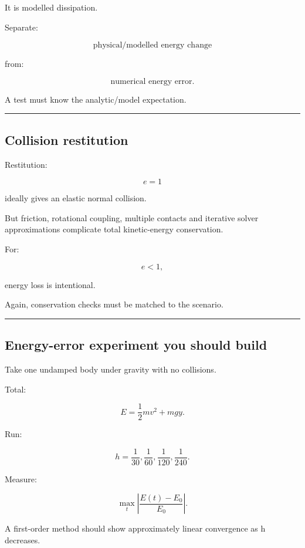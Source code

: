 It is modelled dissipation.

Separate:

\[
\boxed{
\text{physical/modelled energy change}
}
\]

from:

\[
\boxed{
\text{numerical energy error}.
}
\]

A test must know the analytic/model expectation.

\begin{center}\rule{0.5\linewidth}{0.5pt}\end{center}

\subsection{Collision restitution}\label{06-engine-ii-ch039-collision-restitution}

Restitution:

\[
e=1
\]

ideally gives an elastic normal collision.

But friction, rotational coupling, multiple contacts and iterative solver approximations complicate total kinetic-energy conservation.

For:

\[
e<1,
\]

energy loss is intentional.

Again, conservation checks must be matched to the scenario.

\begin{center}\rule{0.5\linewidth}{0.5pt}\end{center}

\subsection{Energy-error experiment you should build}\label{06-engine-ii-ch039-energy-error-experiment-you-should-build}

Take one undamped body under gravity with no collisions.

Total:

\[
E
=
\frac12mv^2+
mgy.
\]

Run:

\[
h=\frac1{30},
\frac1{60},
\frac1{120},
\frac1{240}.
\]

Measure:

\[
\max_t
\left|
\frac{E(t)-E_0}{E_0}
\right|.
\]

A first-order method should show approximately linear convergence as h decreases.

